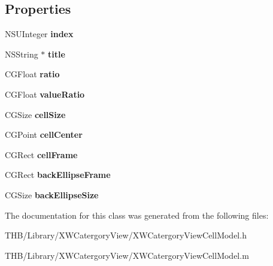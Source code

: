 \subsection*{Properties}
\begin{DoxyCompactItemize}
\item 
\mbox{\label{interface_x_w_catergory_view_cell_model_a6696864b2482765da0d5ea2c0d48325f}} 
N\+S\+U\+Integer {\bfseries index}
\item 
\mbox{\label{interface_x_w_catergory_view_cell_model_abb4e037da9cac2ae9d722ae3c5d9442d}} 
N\+S\+String $\ast$ {\bfseries title}
\item 
\mbox{\label{interface_x_w_catergory_view_cell_model_a3383463eec3c92f37842c39cc99fd39f}} 
C\+G\+Float {\bfseries ratio}
\item 
\mbox{\label{interface_x_w_catergory_view_cell_model_ab71eaa625a38ecbf05381df8fd92cf5a}} 
C\+G\+Float {\bfseries value\+Ratio}
\item 
\mbox{\label{interface_x_w_catergory_view_cell_model_a0f1e2fb69319528967b5a4e8cdddad85}} 
C\+G\+Size {\bfseries cell\+Size}
\item 
\mbox{\label{interface_x_w_catergory_view_cell_model_a0133a2885854ee6acc6f6b626350b1f7}} 
C\+G\+Point {\bfseries cell\+Center}
\item 
\mbox{\label{interface_x_w_catergory_view_cell_model_a00904a02a0550b7974045cac171b5025}} 
C\+G\+Rect {\bfseries cell\+Frame}
\item 
\mbox{\label{interface_x_w_catergory_view_cell_model_a4d247d23756e757063b55e553405f026}} 
C\+G\+Rect {\bfseries back\+Ellipse\+Frame}
\item 
\mbox{\label{interface_x_w_catergory_view_cell_model_ae797f62ac17c17d0fe03bb2fbdae7bbe}} 
C\+G\+Size {\bfseries back\+Ellipse\+Size}
\end{DoxyCompactItemize}


The documentation for this class was generated from the following files\+:\begin{DoxyCompactItemize}
\item 
T\+H\+B/\+Library/\+X\+W\+Catergory\+View/X\+W\+Catergory\+View\+Cell\+Model.\+h\item 
T\+H\+B/\+Library/\+X\+W\+Catergory\+View/X\+W\+Catergory\+View\+Cell\+Model.\+m\end{DoxyCompactItemize}
